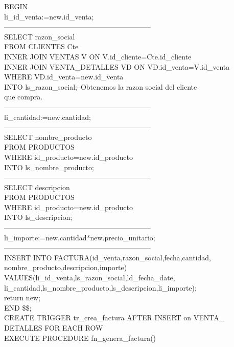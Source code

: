 \documentclass[10pt]{report}
\begin{document}
\begin{enumerate}
\begin{flushleft}
    BEGIN\\
	li\_id\_venta:=new.id\_venta;\\
	--------------------------------------------------------------\\
	SELECT razon\_social\\
	FROM CLIENTES Cte\\
	INNER JOIN VENTAS V 		 ON V.id\_cliente=Cte.id\_cliente\\
	INNER JOIN VENTA\_DETALLES VD ON VD.id\_venta=V.id\_venta\\
	WHERE VD.id\_venta=new.id\_venta\\ 
	INTO ls\_razon\_social;--Obtenemos la razon social del cliente\\ que compra.\\
	--------------------------------------------------------------\\
	li\_cantidad:=new.cantidad;\\
	--------------------------------------------------------------\\
	SELECT nombre\_producto\\
	FROM PRODUCTOS\\
	WHERE id\_producto=new.id\_producto\\
	INTO ls\_nombre\_producto;\\
	--------------------------------------------------------------\\
	SELECT descripcion\\
	FROM PRODUCTOS\\
	WHERE id\_producto=new.id\_producto\\
	INTO ls\_descripcion;\\
	--------------------------------------------------------------\\
	li\_importe:=new.cantidad*new.precio\_unitario;
	--------------------------------------------------------------\\
	
	INSERT INTO FACTURA(id\_venta,razon\_social,fecha,cantidad,\\
	nombre\_producto,descripcion,importe)\\
	VALUES(li\_id\_venta,ls\_razon\_social,ld\_fecha\_date,\\
	li\_cantidad,ls\_nombre\_producto,ls\_descripcion,li\_importe);\\
	
	return new;\\
    END
    \$\$;\\
    
   CREATE TRIGGER tr\_crea\_factura AFTER INSERT on VENTA\_\\
    DETALLES FOR EACH ROW\\
    EXECUTE PROCEDURE fn\_genera\_factura()\\
    \end{flushleft}
  
    
    
\end{enumerate}
\end{document}
